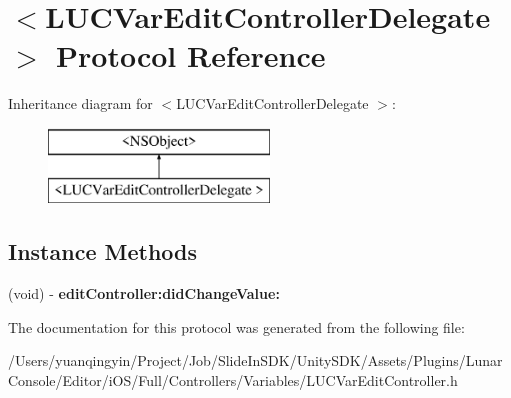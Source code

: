 \hypertarget{protocol_l_u_c_var_edit_controller_delegate_01-p}{}\section{$<$L\+U\+C\+Var\+Edit\+Controller\+Delegate $>$ Protocol Reference}
\label{protocol_l_u_c_var_edit_controller_delegate_01-p}
Inheritance diagram for $<$L\+U\+C\+Var\+Edit\+Controller\+Delegate $>$\+:\begin{figure}[H]
\begin{center}
\leavevmode
\includegraphics[height=2.000000cm]{protocol_l_u_c_var_edit_controller_delegate_01-p}
\end{center}
\end{figure}
\subsection*{Instance Methods}
\begin{DoxyCompactItemize}
\item 
\mbox{\label{protocol_l_u_c_var_edit_controller_delegate_01-p_a9b3973ea61901de7a881facc41d54a6a}} 
(void) -\/ {\bfseries edit\+Controller\+:did\+Change\+Value\+:}
\end{DoxyCompactItemize}


The documentation for this protocol was generated from the following file\+:\begin{DoxyCompactItemize}
\item 
/\+Users/yuanqingyin/\+Project/\+Job/\+Slide\+In\+S\+D\+K/\+Unity\+S\+D\+K/\+Assets/\+Plugins/\+Lunar\+Console/\+Editor/i\+O\+S/\+Full/\+Controllers/\+Variables/L\+U\+C\+Var\+Edit\+Controller.\+h\end{DoxyCompactItemize}
